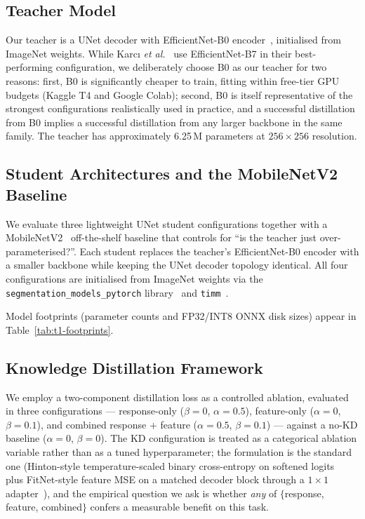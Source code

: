 \subsection{Teacher Model}
\label{sec:methods-teacher}

Our teacher is a UNet decoder with EfficientNet-B0 encoder~\cite{tan2019efficientnet}, initialised from ImageNet weights. While Karc{\i} \emph{et al.}~\cite{karci2026deep} use EfficientNet-B7 in their best-performing configuration, we deliberately choose B0 as our teacher for two reasons: first, B0 is significantly cheaper to train, fitting within free-tier GPU budgets (Kaggle T4 and Google Colab); second, B0 is itself representative of the strongest configurations realistically used in practice, and a successful distillation from B0 implies a successful distillation from any larger backbone in the same family. The teacher has approximately 6.25\,M parameters at $256{\times}256$ resolution.

\subsection{Student Architectures and the MobileNetV2 Baseline}
\label{sec:methods-students}

We evaluate three lightweight UNet student configurations together with a MobileNetV2~\cite{sandler2018mobilenetv2} off-the-shelf baseline that controls for ``is the teacher just over-parameterised?''. Each student replaces the teacher's EfficientNet-B0 encoder with a smaller backbone while keeping the UNet decoder topology identical. All four configurations are initialised from ImageNet weights via the \texttt{segmentation\_models\_pytorch} library~\cite{iakubovskii2019smp} and \texttt{timm}~\cite{wightman2019timm}.

Model footprints (parameter counts and FP32/INT8 ONNX disk sizes) appear in Table~\ref{tab:t1-footprints}.



\subsection{Knowledge Distillation Framework}
\label{sec:methods-kd}

We employ a two-component distillation loss as a controlled ablation, evaluated in three configurations --- response-only ($\beta=0$, $\alpha=0.5$), feature-only ($\alpha=0$, $\beta=0.1$), and combined response $+$ feature ($\alpha=0.5$, $\beta=0.1$) --- against a no-KD baseline ($\alpha=0$, $\beta=0$). The KD configuration is treated as a categorical ablation variable rather than as a tuned hyperparameter; the formulation is the standard one (Hinton-style temperature-scaled binary cross-entropy on softened logits~\cite{hinton2015distilling} plus FitNet-style feature MSE on a matched decoder block through a $1{\times}1$ adapter~\cite{romero2015fitnets}), and the empirical question we ask is whether \emph{any} of $\{$response, feature, combined$\}$ confers a measurable benefit on this task.

